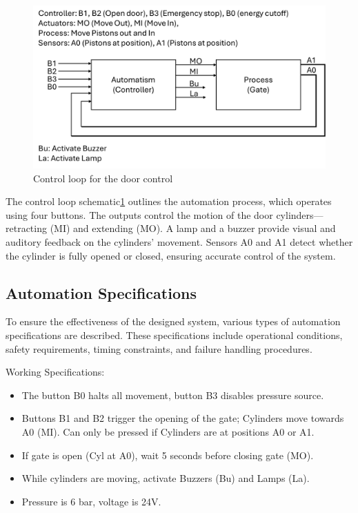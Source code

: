 \begin{figure}[H]
    \includegraphics[width=16cm]{Images/control_loop.png}
    \centering
    \caption{Control loop for the door control}
    \label{fig:control_loop}
\end{figure}

The control loop schematic\ref{fig:control_loop} outlines the automation process, which operates using four buttons. 
The outputs control the motion of the door cylinders—retracting (MI) and extending (MO). 
A lamp and a buzzer provide visual and auditory feedback on the cylinders' movement. Sensors 
A0 and A1 detect whether the cylinder is fully opened or closed, ensuring accurate control of the system.

\subsection{Automation Specifications} \label{sec:Automation_Specifications}

To ensure the effectiveness of the designed system, various types of automation 
specifications are described. These specifications include operational conditions, 
safety requirements, timing constraints, and failure handling procedures.

Working Specifications:
\begin{itemize}
    \item The button B0 halts all movement, button B3 disables pressure source.
    \item Buttons B1 and B2 trigger the opening of the gate; Cylinders move towards A0 (MI). 
    Can only be pressed if Cylinders are at positions A0 or A1.
    \item If gate is open (Cyl at A0),  wait 5 seconds before closing gate (MO).
    \item While cylinders are moving, activate Buzzers (Bu) and Lamps (La).
    \item Pressure is 6 bar, voltage is 24V.
\end{itemize}

